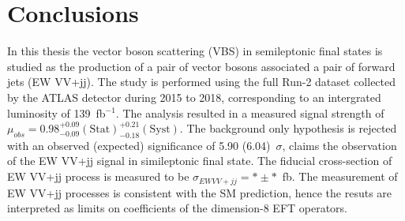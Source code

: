 \chapter{Conclusions}
\label{chap:conclusions}
In this thesis the vector boson scattering (VBS) in semileptonic final states is studied as the production of a pair of vector bosons associated a pair of forward jets (EW VV+jj). 
The study is performed using the full Run-2 dataset collected by the ATLAS detector during 2015 to 2018, corresponding to an intergrated luminosity of 139~fb$^{-1}$.
The analysis resulted in a measured signal strength of $\mu_{obs} = 0.98^{+ 0.09}_{- 0.09}(\mathrm{Stat})^{+ 0.21}_{- 0.18}(\mathrm{Syst})$.
The background only hypothesis is rejected with an observed (expected) significance of 5.90 (6.04)~$\sigma$, claims the observation of the EW VV+jj signal in simileptonic final state. 
The fiducial cross-section of EW VV+jj process is measured to be $\sigma_{EW VV+jj} = * \pm * $~fb.
The measurement of EW VV+jj processes is consistent with the SM prediction, hence the resuts are interpreted as limits on coefficients of the dimension-8 EFT operators.




